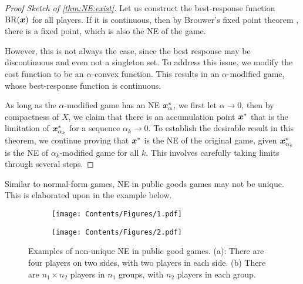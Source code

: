 
% 
\begin{proof}[Proof Sketch of \cref{thm:NE:exist}]
Let us construct the best-response function $\mathrm{BR}({\bm{x}})$ for all players. If it is continuous, then by Brouwer's fixed point theorem \citep{brouwer:brouwer1911abbildung}, there is a fixed point, which is also the NE of the game.

However, this is not always the case, since the best response may be discontinuous and even not a singleton set. To address this issue, we modify the cost function to be an $\alpha$-convex function. This results in an $\alpha$-modified game, whose best-response function is continuous.

As long as the $\alpha$-modified game has an NE ${\bm{x}}^*_\alpha$, we first let $\alpha \to 0$, then by compactness of $X$, we claim that there is an accumulation point ${\bm{x}}^*$ that is the limitation of ${\bm{x}}^*_{\alpha_k}$ for a sequence $\alpha_k\to 0$. 
To establish the desirable result in this theorem, we continue proving that ${\bm{x}}^*$ is the NE of the original game, given ${\bm{x}}^*_{\alpha_k}$ is the NE of $\alpha_k$-modified game for all $k$.
This involves carefully taking limits through several steps.
\end{proof}

Similar to normal-form games, NE in public goods games may not be unique. This is elaborated upon in the example below.

\begin{figure}[t]
\centering
\begin{subfigure}{0.3\textwidth}
    \texttt{[image: Contents/Figures/1.pdf]}
    \label{fig:NE:nonunique-1}
    \caption{}
\end{subfigure}
\begin{subfigure}{0.3\textwidth}
    \texttt{[image: Contents/Figures/2.pdf]}
    \label{fig:NE:nonunique-2}
    \caption{}
\end{subfigure}
\caption{Examples of non-unique NE in public good games. (a): There are four players on two sides, with two players in each side. (b) There are $n_1\times n_2$ players in $n_1$ groups, with $n_2$ players in each group.}
\label{fig:NE:nonunique}
\end{figure}

